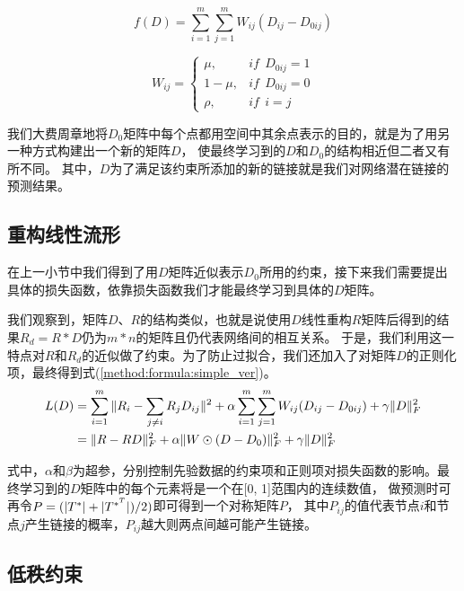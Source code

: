 \begin{equation}
    f(D)=\sum^m_{i=1}\sum^m_{j=1}W_{ij}(D_{ij}-D_{0ij}) \label{method:formula:constraint}
\end{equation}


\begin{equation}
    W_{ij}=\begin{cases}
        \mu,& if\ \ D_{0ij} = 1 \\
        1 - \mu,& if\ \ D_{0ij} = 0 \\
        \rho,& if\ \ i = j
        \end{cases}
        \label{method:formula:weight}
\end{equation}


我们大费周章地将$D_0$矩阵中每个点都用空间中其余点表示的目的，就是为了用另一种方式构建出一个新的矩阵$D$，
使最终学习到的$D$和$D_0$的结构相近但二者又有所不同。
其中，$D$为了满足该约束所添加的新的链接就是我们对网络潜在链接的预测结果。

\subsection{重构线性流形}

在上一小节中我们得到了用$D$矩阵近似表示$D_0$所用的约束，接下来我们需要提出具体的损失函数，依靠损失函数我们才能最终学习到具体的$D$矩阵。


我们观察到，矩阵$D$、$R$的结构类似，也就是说使用$D$线性重构$R$矩阵后得到的结果$R_d=R*D$仍为$m*n$的矩阵且仍代表网络间的相互关系。
于是，我们利用这一特点对$R$和$R_d$的近似做了约束。为了防止过拟合，我们还加入了对矩阵$D$的正则化项，最终得到式(\ref{method:formula:simple_ver})。
\begin{align}
L(D)&=\sum_{i=1}^m\Arrowvert{R_i-\sum_{j\neq{i}} R_jD_{ij} }\Arrowvert^2 + 
\alpha\sum_{i=1}^m\sum_{j=1}^mW_{ij}(D_{ij}-D_{0ij})+\gamma\Arrowvert{D}\Arrowvert_F^2\nonumber \\
    &= \Arrowvert{R-RD}\Arrowvert_F^2+\alpha\Arrowvert{W}\odot(D-D_0)\Arrowvert_F^2+\gamma\Arrowvert{D}\Arrowvert_F^2
    \label{method:formula:simple_ver}
\end{align}

式中，$\alpha$和$\beta$为超参，分别控制先验数据的约束项和正则项对损失函数的影响。最终学习到的$D$矩阵中的每个元素将是一个在[0, 1]范围内的连续数值，
做预测时可再令$P=(\arrowvert{T^*}\arrowvert+\arrowvert{T^{*^T}}\arrowvert)/2)$即可得到一个对称矩阵$P$，
其中$P_{ij}$的值代表节点$i$和节点$j$产生链接的概率，$P_{ij}$越大则两点间越可能产生链接。


\subsection{低秩约束}

